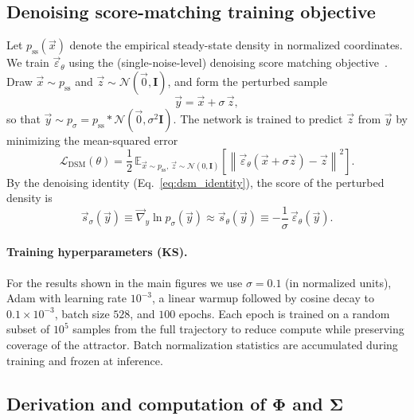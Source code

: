 \documentclass[%
  prl,
  reprint,
  amsmath,
  amssymb,
  aps
]{revtex4-2}
\newcommand{\vvec}[1]{\vec{#1}}
\begin{document}
\subsection{Denoising score-matching training objective}
\label{sec:ks_dsm_training}

Let $p_{\mathrm{ss}}(\vvec{x})$ denote the empirical steady-state density in normalized coordinates. We train $\vvec{\varepsilon}_{\theta}$ using the (single-noise-level) denoising score matching objective~\cite{Vincent2011,SongSohlDicksteinKingma2021}. Draw $\vvec{x}\sim p_{\mathrm{ss}}$ and $\vvec{z}\sim\mathcal{N}(\vvec{0},\bm{I})$, and form the perturbed sample
\begin{equation}
\vvec{y}=\vvec{x}+\sigma\,\vvec{z},
\label{eq:ks_dsm_perturb}
\end{equation}
so that $\vvec{y}\sim p_{\sigma}=p_{\mathrm{ss}}\ast \mathcal{N}(\vvec{0},\sigma^2\bm{I})$. The network is trained to predict $\vvec{z}$ from $\vvec{y}$ by minimizing the mean-squared error
\begin{equation}
\mathcal{L}_{\mathrm{DSM}}(\theta)
=
\frac{1}{2}\,
\mathbb{E}_{\vvec{x}\sim p_{\mathrm{ss}},\,\vvec{z}\sim\mathcal{N}(0,\bm{I})}
\left[\left\|\vvec{\varepsilon}_{\theta}(\vvec{x}+\sigma\vvec{z})-\vvec{z}\right\|^2\right].
\label{eq:ks_dsm_loss}
\end{equation}
By the denoising identity (Eq.~\eqref{eq:dsm_identity}), the score of the perturbed density is
\begin{equation}
\vvec{s}_{\sigma}(\vvec{y})
\equiv
\vvec{\nabla}_{y}\ln p_{\sigma}(\vvec{y})
\approx
\vvec{s}_{\theta}(\vvec{y})
\equiv
-\frac{1}{\sigma}\,\vvec{\varepsilon}_{\theta}(\vvec{y}).
\label{eq:ks_score_from_noise_pred}
\end{equation}

\paragraph{Training hyperparameters (KS).}
For the results shown in the main figures we use $\sigma=0.1$ (in normalized units), Adam with learning rate $10^{-3}$, a linear warmup followed by cosine decay to $0.1\times 10^{-3}$, batch size $528$, and $100$ epochs. Each epoch is trained on a random subset of $10^5$ samples from the full trajectory to reduce compute while preserving coverage of the attractor. Batch normalization statistics are accumulated during training and frozen at inference.

\subsection{Derivation and computation of \texorpdfstring{$\bm{\Phi}$ and $\bm{\Sigma}$}{Phi and Sigma}}
\label{sec:ks_phi_sigma_derivation}
\end{document}
